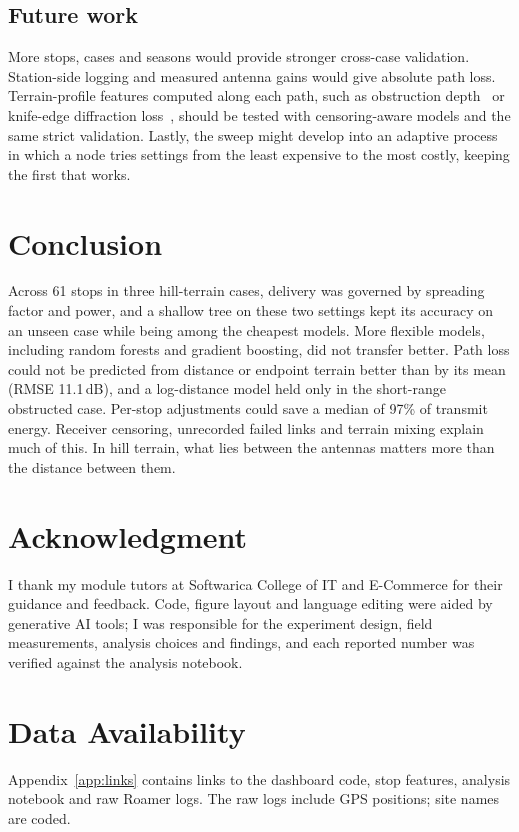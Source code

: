 \documentclass[conference]{IEEEtran}
\newcommand{\dB}{\,dB\xspace}
\begin{document}
\subsection{Future work}
More stops, cases and seasons would provide stronger cross-case validation. Station-side logging and measured antenna gains would give absolute path loss. Terrain-profile features computed along each path, such as obstruction depth~\cite{ethier2024} or knife-edge diffraction loss~\cite{itu_p526}, should be tested with censoring-aware models and the same strict validation. Lastly, the sweep might develop into an adaptive process in which a node tries settings from the least expensive to the most costly, keeping the first that works.

\section{Conclusion}\label{sec:conclusion}
Across 61 stops in three hill-terrain cases, delivery was governed by spreading factor and power, and a shallow tree on these two settings kept its accuracy on an unseen case while being among the cheapest models. More flexible models, including random forests and gradient boosting, did not transfer better. Path loss could not be predicted from distance or endpoint terrain better than by its mean (RMSE 11.1\dB), and a log-distance model held only in the short-range obstructed case. Per-stop adjustments could save a median of 97\% of transmit energy. Receiver censoring, unrecorded failed links and terrain mixing explain much of this. In hill terrain, what lies between the antennas matters more than the distance between them.

\section*{Acknowledgment}
I thank my module tutors at Softwarica College of IT and E-Commerce for their guidance and feedback. Code, figure layout and language editing were aided by generative AI tools; I was responsible for the experiment design, field measurements, analysis choices and findings, and each reported number was verified against the analysis notebook.

\section*{Data Availability}
Appendix~\ref{app:links} contains links to the dashboard code, stop features, analysis notebook and raw Roamer logs. The raw logs include GPS positions; site names are coded.
\end{document}
